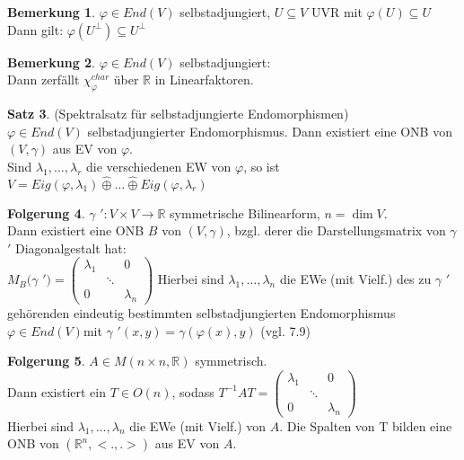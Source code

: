 \documentclass[10pt,a4paper,numbers=endperiod]{scrartcl}
\theoremstyle{definition}
\newtheorem{satz}{Satz}[section]
\newtheorem{bem}[satz]{Bemerkung}
\newtheorem{folg}[satz]{Folgerung}
\def\RR{{\mathbb R}}
\begin{document}
\begin{bem}
	$\varphi \in End(V)$ selbstadjungiert, $U \subseteq V$ UVR mit $\varphi(U) \subseteq U$\\
	Dann gilt: $\varphi (U^{\perp}) \subseteq U^{\perp}$
\end{bem}

\begin{bem}
	$\varphi \in End(V)$ selbstadjungiert:\\
	Dann zerfällt $\chi_\varphi^{char}$ über $\RR$ in Linearfaktoren.
\end{bem}

\begin{satz}
	(Spektralsatz für selbstadjungierte Endomorphismen)\\
	$\varphi \in End(V)$ selbstadjungierter Endomorphismus. Dann existiert eine ONB von $(V, \gamma)$ aus EV von $\varphi$.\\
	Sind $\lambda_1, \ldots, \lambda_r$ die verschiedenen EW von $\varphi$, so ist $V = Eig(\varphi, \lambda_1) \hat{\oplus} \ldots \hat{\oplus} Eig(\varphi, \lambda_r)$
\end{satz}

\begin{folg}
	$\gamma$ $': V \times V \rightarrow \RR$ symmetrische Bilinearform, $n = \dim V$.\\
	Dann existiert eine ONB $B$ von $(V, \gamma)$, bzgl. derer die Darstellungsmatrix von $\gamma$ $'$ Diagonalgestalt hat:\\
	$M_B(\gamma$ $') = \begin{pmatrix}
	\lambda_1 & & 0\\
	& \ddots &\\
	0 & & \lambda_n
	\end{pmatrix}$ 
	Hierbei sind $\lambda_1, \ldots, \lambda_n$ die EWe (mit Vielf.) des zu $\gamma$ $'$ gehörenden eindeutig bestimmten selbstadjungierten Endomorphismus $\varphi \in End(V)$mit $\gamma$ $'(x,y)  = \gamma(\varphi(x), y)$ (vgl. 7.9) 
\end{folg}

\begin{folg}
	$A \in M(n \times n, \RR)$ symmetrisch.\\
	Dann existiert ein $T \in O(n)$, sodass $T^{-1} A T = \begin{pmatrix}
	\lambda_1 & & 0\\
	& \ddots &\\
	0 & & \lambda_n
	\end{pmatrix}$\\
	Hierbei sind $\lambda_1, \ldots, \lambda_n$ die EWe (mit Vielf.) von $A$. Die Spalten von T bilden eine ONB von $(\RR^n, <.,.>)$ aus EV von $A$.
\end{folg}
\end{document}
